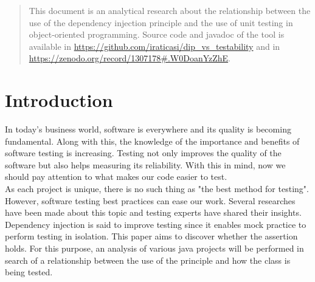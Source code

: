\documentclass[11pt, a4paper, twocolumn]{article}
\begin{document}
\begin{abstract}
This document is an analytical research about the relationship between the use of the dependency injection principle and the use of unit testing in object-oriented programming. Source code and javadoc of the tool is available in \url{https://github.com/iraticasi/dip_vs_testability} and in \url{https://zenodo.org/record/1307178#.W0DoanYzZhE}.
\end{abstract}


\section{Introduction}
In today’s business world, software is everywhere and its quality is becoming fundamental. Along with this, the knowledge of the importance and benefits of software testing is increasing. Testing not only improves the quality of the software but also helps measuring its reliability. With this in mind, now we should pay attention to what makes our code easier to test.\\
As each project is unique, there is no such thing as "the best method for testing". However, software testing best practices can ease our work. Several researches have been made about this topic and testing experts have shared their insights.\\
Dependency injection is said to improve testing since it enables mock practice to perform testing in isolation. This paper aims to discover whether the assertion holds. For this purpose, an analysis of various java projects will be performed in search of a relationship between the use of the principle and how the class is being tested.


\end{document}
